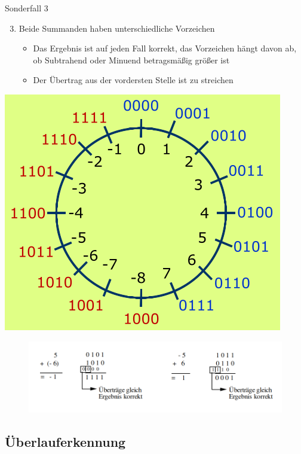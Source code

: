 \documentclass[12pt%
,xcolor=table
,aspectratio=169%
]{beamer}
\begin{document}
\begin{frame}{Sonderfall 3}
	\begin{enumerate} \setcounter{enumi}{2}
		\item Beide Summanden haben unterschiedliche Vorzeichen
		\begin{itemize}
			\item Das Ergebnis ist auf jeden Fall korrekt, das Vorzeichen hängt davon ab, ob Subtrahend oder Minuend betragsmäßig größer ist
			\item Der Übertrag aus der vordersten Stelle ist zu streichen
		\end{itemize}
	\end{enumerate}
\endminipage\hfill
{}%
  \includegraphics[scale=0.3]{pictures/sub3}
\endminipage
\begin{figure}
\includegraphics[scale=0.32]{pictures/sub5}
\end{figure}
\end{frame}

\subsection{Überlauferkennung}
\end{document}
